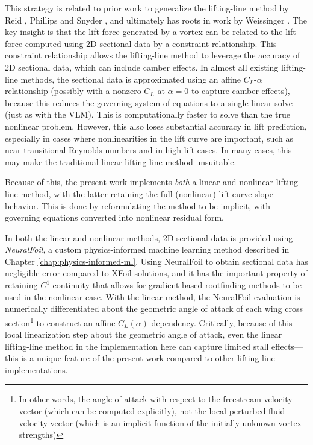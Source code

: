 This strategy is related to prior work to generalize the lifting-line method by Reid \cite{reid_general_2020}, Phillips and Snyder \cite{phillips_modern_2000}, and ultimately has roots in work by Weissinger \cite{weissinger1947lift}. The key insight is that the lift force generated by a vortex can be related to the lift force computed using 2D sectional data by a constraint relationship. This constraint relationship allows the lifting-line method to leverage the accuracy of 2D sectional data, which can include camber effects. In almost all existing lifting-line methods, the sectional data is approximated using an affine $C_L$-$\alpha$ relationship (possibly with a nonzero $C_L$ at $\alpha=0$ to capture camber effects), because this reduces the governing system of equations to a single linear solve (just as with the VLM). This is computationally faster to solve than the true nonlinear problem. However, this also loses substantial accuracy in lift prediction, especially in cases where nonlinearities in the lift curve are important, such as near transitional Reynolds numbers and in high-lift cases. In many cases, this may make the traditional linear lifting-line method unsuitable.

Because of this, the present work implements \emph{both} a linear and nonlinear lifting line method, with the latter retaining the full (nonlinear) lift curve slope behavior. This is done by reformulating the method to be implicit, with governing equations converted into nonlinear residual form.

In both the linear and nonlinear methods, 2D sectional data is provided using \emph{NeuralFoil}, a custom physics-informed machine learning method described in Chapter \ref{chap:physics-informed-ml}. Using NeuralFoil to obtain sectional data has negligible error compared to XFoil solutions, and it has the important property of retaining $C^1$-continuity that allows for gradient-based rootfinding methods to be used in the nonlinear case. With the linear method, the NeuralFoil evaluation is numerically differentiated about the geometric angle of attack of each wing cross section\footnote{In other words, the angle of attack with respect to the freestream velocity vector (which can be computed explicitly), not the local perturbed fluid velocity vector (which is an implicit function of the initially-unknown vortex strengths)} to construct an affine $C_L(\alpha)$ dependency. Critically, because of this local linearization step about the geometric angle of attack, even the linear lifting-line method in the implementation here can capture limited stall effects—this is a unique feature of the present work compared to other lifting-line implementations.

